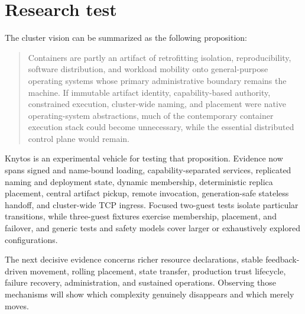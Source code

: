 \section{Research test}

The cluster vision can be summarized as the following proposition:

\begin{quote}
    Containers are partly an artifact of retrofitting isolation,
    reproducibility, software distribution, and workload mobility onto
    general-purpose operating systems whose primary administrative boundary
    remains the machine. If immutable artifact identity, capability-based
    authority, constrained execution, cluster-wide naming, and placement were
    native operating-system abstractions, much of the contemporary container
    execution stack could become unnecessary, while the essential
    distributed control plane would remain.
\end{quote}

Knytos is an experimental vehicle for testing that proposition. Evidence
now spans signed and name-bound loading, capability-separated services,
replicated naming and deployment state, dynamic membership, deterministic
replica placement, central artifact pickup, remote invocation,
generation-safe stateless handoff, and cluster-wide TCP ingress. Focused
two-guest tests isolate particular transitions, while three-guest fixtures exercise
membership, placement, and failover, and generic tests and safety models cover
larger or exhaustively explored configurations.

The next decisive evidence concerns richer resource declarations, stable
feedback-driven movement, rolling placement, state transfer, production trust
lifecycle, failure recovery, administration, and sustained operations.
Observing those mechanisms will show which complexity genuinely disappears and
which merely moves.

\endinput
